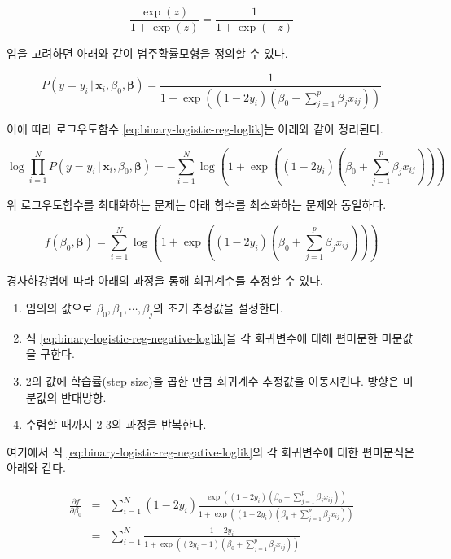 \documentclass[]{book}
\providecommand{\tightlist}{%
  \setlength{\itemsep}{0pt}\setlength{\parskip}{0pt}}
\begin{document}
\begin{equation*}
\frac{\exp(z)}{1 + \exp(z)} = \frac{1}{1 + \exp(-z)}
\end{equation*}

임을 고려하면 아래와 같이 범주확률모형을 정의할 수 있다.

\begin{equation*}
P(y = y_i \,|\, \mathbf{x}_i, \beta_0, \boldsymbol\beta) = \frac{1}{1 + \exp\left((1 - 2y_i)(\beta_0 + \sum_{j = 1}^{p} \beta_j x_{ij})\right)}
\end{equation*}

이에 따라 로그우도함수 \eqref{eq:binary-logistic-reg-loglik}는 아래와 같이 정리된다.

\begin{equation*}
\log \prod_{i = 1}^{N} P(y = y_i \,|\, \mathbf{x}_i, \beta_0, \boldsymbol\beta) = - \sum_{i = 1}^{N} \log \left(1 + \exp\left((1 - 2y_i)(\beta_0 + \sum_{j = 1}^{p} \beta_j x_{ij})\right)\right)
\end{equation*}

위 로그우도함수를 최대화하는 문제는 아래 함수를 최소화하는 문제와 동일하다.

\begin{equation}
f(\beta_0, \boldsymbol\beta) = \sum_{i = 1}^{N} \log \left(1 + \exp\left((1 - 2y_i)(\beta_0 + \sum_{j = 1}^{p} \beta_j x_{ij})\right)\right)
\label{eq:binary-logistic-reg-negative-loglik}
\end{equation}

경사하강법에 따라 아래의 과정을 통해 회귀계수를 추정할 수 있다.

\begin{enumerate}
\def\labelenumi{\arabic{enumi}.}
\tightlist
\item
  임의의 값으로 \(\beta_0, \beta_1, \cdots, \beta_j\)의 초기 추정값을 설정한다.
\item
  식 \eqref{eq:binary-logistic-reg-negative-loglik}을 각 회귀변수에 대해 편미분한 미분값을 구한다.
\item
  2의 값에 학습률(step size)을 곱한 만큼 회귀계수 추정값을 이동시킨다. 방향은 미분값의 반대방향.
\item
  수렴할 때까지 2-3의 과정을 반복한다.
\end{enumerate}

여기에서 식 \eqref{eq:binary-logistic-reg-negative-loglik}의 각 회귀변수에 대한 편미분식은 아래와 같다.

\begin{eqnarray*}
\frac{\partial f}{\partial \beta_0} &=& \sum_{i = 1}^{N} (1 - 2y_i) \frac{\exp\left((1 - 2y_i)(\beta_0 + \sum_{j = 1}^{p} \beta_j x_{ij})\right)}{1 + \exp\left((1 - 2y_i)(\beta_0 + \sum_{j = 1}^{p} \beta_j x_{ij})\right)}\\
&=& \sum_{i = 1}^{N} \frac{1 - 2y_i}{1 + \exp\left((2y_i - 1)(\beta_0 + \sum_{j = 1}^{p} \beta_j x_{ij})\right)}
\end{eqnarray*}
\end{document}
